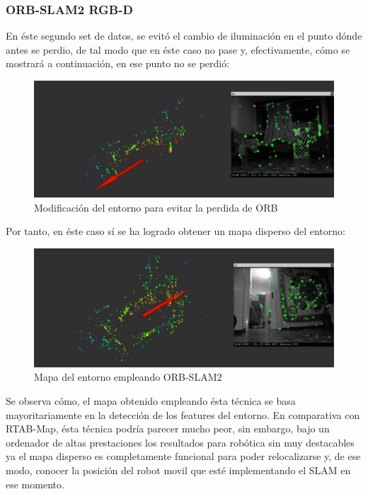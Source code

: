 \newpage
\subsubsection{ORB-SLAM2 RGB-D}
En éste segundo set de datos, se evitó el cambio de iluminación en el punto dónde antes se perdio, de tal modo que en éste caso no pase y, efectivamente, cómo se mostrará a continuación,
en ese punto no se perdió:
\begin{figure}[h!]
    \centering
    \includegraphics[width=.9\textwidth]{images/slam/bag3_orb_avoidLOSE}
    \caption{Modificación del entorno para evitar la perdida de ORB}
\end{figure}

Por tanto, en éste caso sí se ha logrado obtener un mapa disperso del entorno:
\begin{figure}[h!]
    \centering
    \includegraphics[width=.9\textwidth]{images/slam/bag3_orb_map}
    \caption{Mapa del entorno empleando ORB-SLAM2}
\end{figure}

Se observa cómo, el mapa obtenido empleando ésta técnica se basa mayoritariamente en la detección de los features del entorno. En comparativa con RTAB-Map, ésta técnica podría parecer
mucho peor, sin embargo, bajo un ordenador de altas prestaciones los resultados para robótica sin muy destacables ya el mapa disperso es completamente funcional para poder relocalizarse
y, de ese modo, conocer la posición del robot movil que esté implementando el SLAM en ese momento.
\newpage
